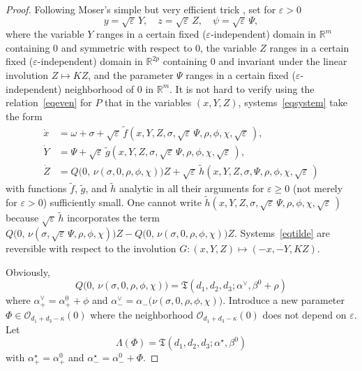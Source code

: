 \documentclass[12pt,reqno]{amsart}
\theoremstyle{definition}
\begin{document}
\begin{proof}
Following Moser's simple but very efficient trick \cite[Section~6b)]{M67}, set
for ${\varepsilon}>0$
\[
y={{\sqrt{\varepsilon}}\,} Y, \quad z={{\sqrt{\varepsilon}}\,} Z, \quad \psi={{\sqrt{\varepsilon}}\,}\Psi,
\]
where the variable $Y$ ranges in a certain fixed (${\varepsilon}$-independent) domain
in ${\mathbb R}^m$ containing $0$ and symmetric with respect to $0$, the variable $Z$
ranges in a certain fixed (${\varepsilon}$-independent) domain in ${\mathbb R}^{2p}$
containing $0$ and invariant under the linear involution $Z\mapsto KZ$, and
the parameter $\Psi$ ranges in a certain fixed (${\varepsilon}$-independent)
neighborhood of $0$ in ${\mathbb R}^m$. It is not hard to verify using the
relation~\eqref{eqeven} for $P$ that in the variables $(x,Y,Z)$,
systems~\eqref{eqsystem} take the form
\begin{equation}
\begin{aligned}
\dot{x} &= \omega+\sigma+
{{\sqrt{\varepsilon}}\,}{\widetilde{f}}(x,Y,Z,\sigma,{{\sqrt{\varepsilon}}\,}\Psi,\rho,\phi,\chi,{{\sqrt{\varepsilon}}\,}), \\
\dot{Y} &= \Psi+
{{\sqrt{\varepsilon}}\,}{\widetilde{g}}(x,Y,Z,\sigma,{{\sqrt{\varepsilon}}\,}\Psi,\rho,\phi,\chi,{{\sqrt{\varepsilon}}\,}), \\
\dot{Z} &= Q\bigl(0, \, \nu(\sigma,0,\rho,\phi,\chi)\bigr)Z+
{{\sqrt{\varepsilon}}\,}{\widetilde{h}}(x,Y,Z,\sigma,\Psi,\rho,\phi,\chi,{{\sqrt{\varepsilon}}\,})
\end{aligned}
\label{eqtilde}
\end{equation}
with functions ${\widetilde{f}}$, ${\widetilde{g}}$, and ${\widetilde{h}}$ analytic in all their arguments for
${\varepsilon}{\geqslant} 0$ (not merely for ${\varepsilon}>0$) sufficiently small. One cannot write
${\widetilde{h}}(x,Y,Z,\sigma,{{\sqrt{\varepsilon}}\,}\Psi,\rho,\phi,\chi,{{\sqrt{\varepsilon}}\,})$ because ${{\sqrt{\varepsilon}}\,}{\widetilde{h}}$
incorporates the term
$Q\bigl(0, \, \nu(\sigma,{{\sqrt{\varepsilon}}\,}\Psi,\rho,\phi,\chi)\bigr)Z -
Q\bigl(0, \, \nu(\sigma,0,\rho,\phi,\chi)\bigr)Z$. Systems~\eqref{eqtilde}
are reversible with respect to the involution $G:(x,Y,Z)\mapsto(-x,-Y,KZ)$.

Obviously,
\[
Q\bigl(0, \, \nu(\sigma,0,\rho,\phi,\chi)\bigr)=
{\mathfrak T}(d_1,d_2,d_3;\alpha^\vee,\beta^0+\rho)
\]
where $\alpha^\vee_+=\alpha^0_++\phi$ and
$\alpha^\vee_-=\alpha_-\bigl(\nu(\sigma,0,\rho,\phi,\chi)\bigr)$. Introduce a
new parameter $\Phi\in{\mathcal O}_{d_1+d_3-\kappa}(0)$ where the neighborhood
${\mathcal O}_{d_1+d_3-\kappa}(0)$ does not depend on ${\varepsilon}$. Let
\[
\Lambda(\Phi)={\mathfrak T}(d_1,d_2,d_3;\alpha^\star,\beta^0)
\]
with $\alpha^\star_+=\alpha^0_+$ and $\alpha^\star_-=\alpha^0_-+\Phi$.


\end{proof}
\end{document}

